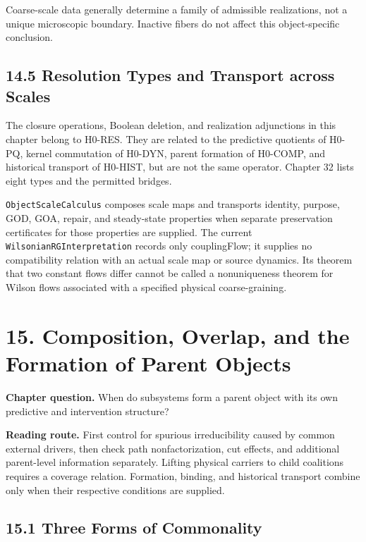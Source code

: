 \documentclass[
  english,
  11pt,
  oneside]{book}
\begin{document}
Coarse-scale data generally determine a family of admissible realizations, not a unique microscopic boundary. Inactive fibers do not affect this object-specific conclusion.

\section{14.5 Resolution Types and Transport across Scales}\label{resolution-types-and-transport-across-scales}

The closure operations, Boolean deletion, and realization adjunctions in this chapter belong to H0-RES. They are related to the predictive quotients of H0-PQ, kernel commutation of H0-DYN, parent formation of H0-COMP, and historical transport of H0-HIST, but are not the same operator. Chapter 32 lists eight types and the permitted bridges.

\nolinkurl{ObjectScaleCalculus} composes scale maps and transports identity, purpose, GOD, GOA, repair, and steady-state properties when separate preservation certificates for those properties are supplied. The current \nolinkurl{WilsonianRGInterpretation} records only couplingFlow; it supplies no compatibility relation with an actual scale map or source dynamics. Its theorem that two constant flows differ cannot be called a nonuniqueness theorem for Wilson flows associated with a specified physical coarse-graining.

\chapter{15. Composition, Overlap, and the Formation of Parent Objects}\label{ch-15}

\textbf{Chapter question.} When do subsystems form a parent object with its own predictive and intervention structure?

\textbf{Reading route.} First control for spurious irreducibility caused by common external drivers, then check path nonfactorization, cut effects, and additional parent-level information separately. Lifting physical carriers to child coalitions requires a coverage relation. Formation, binding, and historical transport combine only when their respective conditions are supplied.

\section{15.1 Three Forms of Commonality}\label{three-forms-of-commonality}
\end{document}
